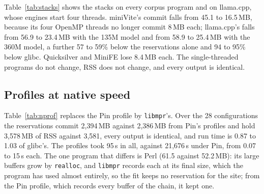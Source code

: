 \documentclass[11pt]{article}
\newcommand{\libmpr}{\texttt{libmpr}}
\newcommand{\secref}[1]{Section~\ref{#1}}
\newcommand{\tabref}[1]{Table~\ref{#1}}
\begin{document}
\begin{table}[t]
\centering\small

\caption{\libmpr{}'s \texttt{MAP\_NORESERVE} stacks (\secref{sec:stacks}) on the corpus's largest inputs and
llama.cpp, with each program's own reservations: peak commit and RSS in MB, time relative to glibc, mean of 3
runs. The programs whose commit changes by more than 0.5\,MB are listed; every output is identical.}
\label{tab:stacks}
\end{table}

\tabref{tab:stacks} shows the stacks on every corpus program and on llama.cpp, whose engines start four threads.
miniVite's commit falls from 45.1 to 16.5\,MB, because its four
OpenMP threads no longer commit 8\,MB each; llama.cpp's falls from 56.9 to 23.4\,MB with the 135M model and from
58.9 to 25.4\,MB with the 360M model, a further 57 to 59\% below the reservations alone and 94 to 95\% below glibc.
Quicksilver and MiniFE lose 8.4\,MB each. The single-threaded programs do not change, RSS does not change, and
every output is identical.

\subsection{Profiles at native speed}

\begin{table}[t]
\centering\small
\resizebox{\linewidth}{!}{}
\caption{Reservations from \libmpr{}'s own profile (\secref{sec:nprof}, one native run) against those from the Pin
tool's \texttt{-sites} profile of the same input, on the corpus's largest inputs and the LLM engines: profiling time
(Pin's from \tabref{tab:pincost}, upper bounds), and peak commit and RSS with each set of reservations, mean of 3 runs
(thread stacks off, to compare the reservations alone).}
\label{tab:nprof}
\end{table}

\tabref{tab:nprof} replaces the Pin profile by \libmpr{}'s. Over the 28 configurations the reservations commit
2{,}394\,MB against 2{,}386\,MB from Pin's profiles and hold 3{,}578\,MB of RSS against 3{,}581, every output is
identical, and run time is 0.87 to 1.03 of glibc's. The profiles took 95\,s in all, against 21{,}676\,s under
Pin, from 0.07 to 15\,s each. The one program that differs is Perl (61.5 against 52.2\,MB): its large buffers grow by
\texttt{realloc}, and \libmpr{} records each at its final size, which the program has used almost entirely, so the fit
keeps no reservation for the site; from the Pin profile, which records every buffer of the chain, it kept one.
\end{document}
